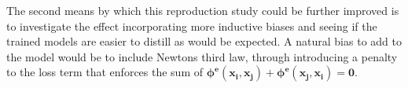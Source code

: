 \documentclass[11pt]{article}
\begin{document}
    The second means by which this reproduction study could be further improved is to investigate the effect incorporating more inductive biases and seeing if the trained models are easier to distill as would be expected. A natural bias to add to the model would be to include Newtons third law, through introducing a penalty to the loss term that enforces the sum of $\mathbf{\phi^{e}(x_i, x_j)} + \mathbf{\phi^e(x_j,x_i)} = \textbf{0}$.

\end{document}
